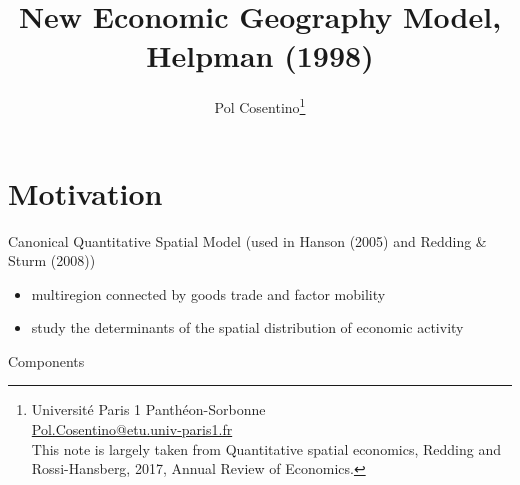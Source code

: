 \documentclass[11pt]{article}
\title{New Economic Geography Model, \\ Helpman (1998)}
\author[]{Pol Cosentino\thanks{\small{Université Paris 1 Panthéon-Sorbonne\\ \href{mailto:Pol.Cosentino@etu.univ-paris1.fr}{Pol.Cosentino@etu.univ-paris1.fr}}  
\\ This note is largely taken from Quantitative spatial economics, Redding and Rossi-Hansberg, 2017, Annual Review of Economics.}}
\date{}
\begin{document}
\thispagestyle{empty}
\maketitle



\thispagestyle{empty}%
\newpage


 \setcounter{page}{1} %


\section*{Motivation}
Canonical Quantitative Spatial Model (used in Hanson (2005) and Redding \& Sturm (2008))
\begin{itemize}
\item multiregion connected by goods trade and factor mobility
\item study the determinants of the spatial distribution of economic activity 
\end{itemize}
Components
\end{document}
